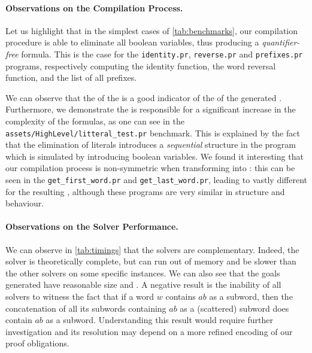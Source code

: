 \paragraph{Observations on the Compilation Process.} Let us highlight that in
the simplest cases of \cref{tab:benchmarks}, our compilation procedure is able
to eliminate all boolean variables, thus producing a \emph{quantifier-free}
formula. This is the case for the \texttt{identity.pr}, \texttt{reverse.pr} and
\texttt{prefixes.pr} programs, respectively computing the identity function,
the word reversal function, and the list of all prefixes.

We can observe that the  of the  is a
good indicator of the  of the generated . Furthermore, we demonstrate the 
is responsible for a significant increase in the complexity of the formulas, as
one can see in the \texttt{assets/HighLevel/litteral\_test.pr} benchmark. This
is explained by the fact that the elimination of literals introduces a
\emph{sequential} structure in the program which is simulated by introducing
boolean variables. We found it interesting that our compilation process is
non-symmetric when transforming  into : this can be seen in the \texttt{get\_first\_word.pr} and
\texttt{get\_last\_word.pr}, leading to vastly different 
for the resulting , although these programs are
very similar in structure and behaviour.

\paragraph{Observations on the Solver Performance.} We can observe in
\cref{tab:timings} that the solvers are complementary. Indeed, the 
solver is theoretically complete, but can run out of memory and be slower than
the other solvers on some specific instances. We can also see that the goals
generated have reasonable size and . A negative result is
the inability of all solvers to witness the fact that if a word $w$ contains
$ab$ as a subword, then the concatenation of all its subwords containing $ab$
as a (scattered) subword does contain $ab$ as a subword. Understanding this
result would require further investigation and its resolution may depend on a
more refined encoding of our proof obligations.

